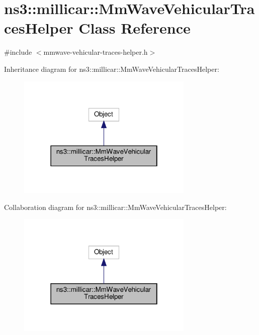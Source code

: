\hypertarget{classns3_1_1millicar_1_1MmWaveVehicularTracesHelper}{}\section{ns3\+:\+:millicar\+:\+:Mm\+Wave\+Vehicular\+Traces\+Helper Class Reference}
\label{classns3_1_1millicar_1_1MmWaveVehicularTracesHelper}


{\ttfamily \#include $<$mmwave-\/vehicular-\/traces-\/helper.\+h$>$}



Inheritance diagram for ns3\+:\+:millicar\+:\+:Mm\+Wave\+Vehicular\+Traces\+Helper\+:
\nopagebreak
\begin{figure}[H]
\begin{center}
\leavevmode
\includegraphics[width=238pt]{classns3_1_1millicar_1_1MmWaveVehicularTracesHelper__inherit__graph}
\end{center}
\end{figure}


Collaboration diagram for ns3\+:\+:millicar\+:\+:Mm\+Wave\+Vehicular\+Traces\+Helper\+:
\nopagebreak
\begin{figure}[H]
\begin{center}
\leavevmode
\includegraphics[width=238pt]{classns3_1_1millicar_1_1MmWaveVehicularTracesHelper__coll__graph}
\end{center}
\end{figure}
